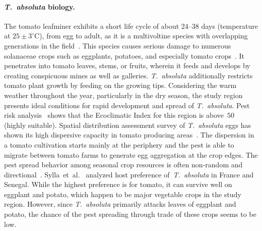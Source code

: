 \documentclass[11pt]{article}
\newcommand{\tuta}{\emph{T.~absoluta}}
\newcommand{\aacomment}[1]{({\color{magenta}AA: #1})}
\theoremstyle{definition}
\begin{document}
\paragraph{\tuta{} biology.}
The tomato leafminer exhibits a short life cycle of about 24--38 days
(temperature at $25\pm3^\circ$C), from egg to adult, as it is a
multivoltine species with overlapping generations in the
field~\cite{guedes2012tomato}. This species causes serious damage to
numerous solanaceae crops such as eggplants, potatoes, and especially
tomato crops~\cite{sylla2018}. It penetrates into tomato leaves, stems, or
fruits, wherein it feeds and develops by creating conspicuous mines as well
as galleries. \tuta{} additionally restricts tomato plant growth by feeding
on the growing tips. Considering the warm weather throughout the year,
particularly in the dry season, the study region presents ideal conditions
for rapid development and spread of \tuta{}. Pest risk
analysis~\cite{tonnang2015identification} shows that the Ecoclimatic Index
for this region is above~$50$ (highly suitable). Spatial distribution
assessment survey of \tuta{} eggs has shown its high dispersive capacity in
tomato producing areas~\cite{martins2018assessing}. The dispersion in a
tomato cultivation starts mainly at the periphery and
the pest is able to migrate between tomato farms to generate egg aggregation at the
crop edges. The pest spread behavior among seasonal crop resources
is often non-random and directional~\cite{martins2018assessing}.
Sylla~et~al.~\cite{sylla2018} analyzed host preference of~\tuta{} in France
and Senegal. While the highest preference is for tomato, it can survive
well on eggplant and potato, which happen to be major vegetable crops in
the study region. However, since \tuta{} primarily attacks leaves of
eggplant and potato, the chance of the pest spreading through trade of
these crops seems to be low.
\end{document}
